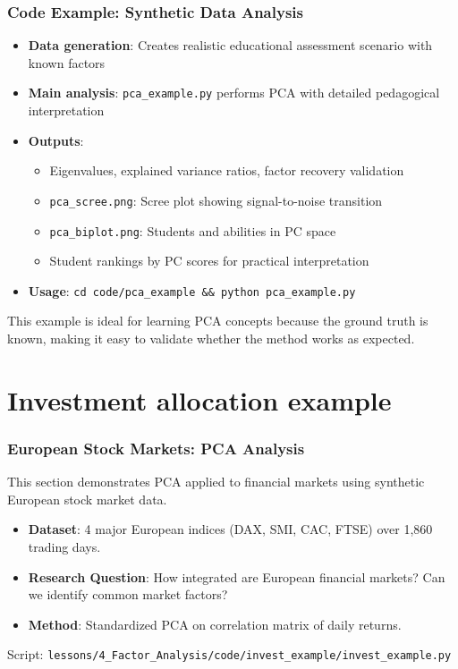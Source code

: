 \documentclass[aspectratio=169]{beamer}
\begin{document}
\begin{frame}
    \frametitle{Code Example: Synthetic Data Analysis}
    \begin{itemize}
        \item \textbf{Data generation}: Creates realistic educational assessment scenario with known factors \pause
        \item \textbf{Main analysis}: \texttt{pca\_example.py} performs PCA with detailed pedagogical interpretation \pause
        \item \textbf{Outputs}:
              \begin{itemize}
                  \item Eigenvalues, explained variance ratios, factor recovery validation \pause
                  \item \texttt{pca\_scree.png}: Scree plot showing signal-to-noise transition \pause
                  \item \texttt{pca\_biplot.png}: Students and abilities in PC space \pause
                  \item Student rankings by PC scores for practical interpretation \pause
              \end{itemize}
        \item \textbf{Usage}: \texttt{cd code/pca\_example \&\& python pca\_example.py} \pause
    \end{itemize}
    \vspace{6pt}
    This example is ideal for learning PCA concepts because the ground truth is known, making it easy to validate whether the method works as expected.
\end{frame}

\section{Investment allocation example}

\begin{frame}
    \frametitle{European Stock Markets: PCA Analysis}
    This section demonstrates PCA applied to financial markets using synthetic European stock market data.
    \begin{itemize}
        \item \textbf{Dataset}: 4 major European indices (DAX, SMI, CAC, FTSE) over 1,860 trading days. \pause
        \item \textbf{Research Question}: How integrated are European financial markets? Can we identify common market factors? \pause
        \item \textbf{Method}: Standardized PCA on correlation matrix of daily returns. \pause
    \end{itemize}
    \vspace{6pt}
    Script: \texttt{lessons/4\_Factor\_Analysis/code/invest\_example/invest\_example.py}
\end{frame}
\end{document}
